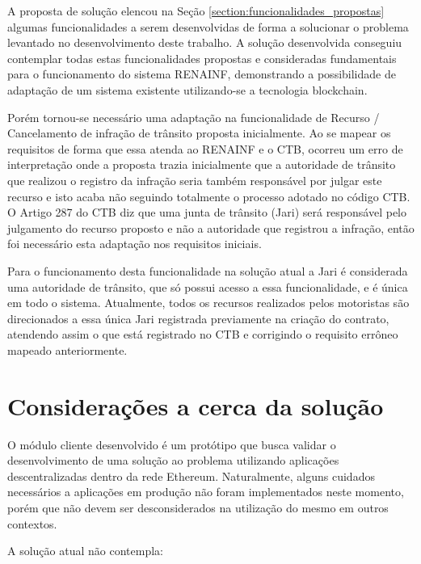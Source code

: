 A proposta de solução elencou na Seção \ref{section:funcionalidades_propostas} algumas funcionalidades a serem desenvolvidas de forma a solucionar o problema levantado no desenvolvimento deste trabalho. A solução desenvolvida conseguiu contemplar todas estas funcionalidades propostas e consideradas fundamentais para o funcionamento do sistema RENAINF, demonstrando a possibilidade de adaptação de um sistema existente utilizando-se a tecnologia blockchain.

Porém tornou-se necessário uma adaptação na funcionalidade de Recurso / Cancelamento de infração de trânsito proposta inicialmente. Ao se mapear os requisitos de forma que essa atenda ao RENAINF e o CTB, ocorreu um erro de interpretação onde a proposta trazia inicialmente que a autoridade de trânsito que realizou o registro da infração seria também responsável por julgar este recurso e isto acaba não seguindo totalmente o processo adotado no código CTB. O Artigo 287 do CTB diz que uma junta de trânsito (Jari) será responsável pelo julgamento do recurso proposto e não a autoridade que registrou a infração, então foi necessário esta adaptação nos requisitos iniciais.

Para o funcionamento desta funcionalidade na solução atual a Jari é considerada uma autoridade de trânsito, que só possui acesso a essa funcionalidade, e é única em todo o sistema. Atualmente, todos os recursos realizados pelos motoristas são direcionados a essa única Jari registrada previamente na criação do contrato, atendendo assim o que está registrado no CTB e corrigindo o requisito errôneo mapeado anteriormente.


\section{Considerações a cerca da solução}

O módulo cliente desenvolvido é um protótipo que busca validar o desenvolvimento de uma solução ao problema utilizando aplicações descentralizadas dentro da rede Ethereum. Naturalmente, alguns cuidados necessários a aplicações em produção não foram implementados neste momento, porém que não devem ser desconsiderados na utilização do mesmo em outros contextos.

A solução atual não contempla:

